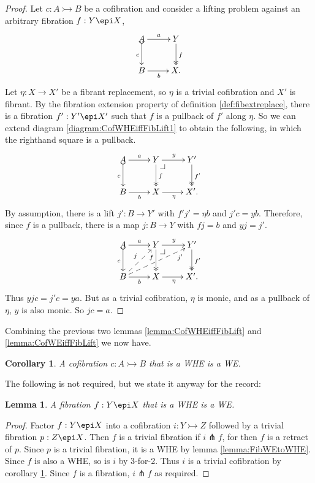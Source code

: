 \documentclass[11pt]{article}
\makeatletter
\newcommand{\pbcorner}[1][dr]{\save*!/#1-1.2pc/#1:(-1,1)@^{|-}\restore}
\newcommand{\mono}{\ensuremath{\rightarrowtail}}
\newcommand{\ra}{\ensuremath{\rightarrow}}
\newtheorem{lemma}[theorem]{Lemma}
\newtheorem{corollary}[theorem]{Corollary}
\theoremstyle{remark}
\theoremstyle{definition}
\makeatother
\begin{document}
\begin{proof}
Let $c : A\mono B$ be a cofibration and consider a lifting problem against an arbitrary fibration $f: Y\epi X$,
\begin{equation}\label{diagram:CofWHEiffFibLift1}
\xymatrix{
A \ar@{>->}[d]_{c} \ar[r]^-{a}  & Y \ar@{>>}[d]^{f} \\
B \ar[r]_{b} &  X.
}
\end{equation}
Let $\eta: X\ra X'$ be a fibrant replacement, so $\eta$ is a trivial cofibration and $X'$ is fibrant. 
By the fibration extension property of definition \ref{def:fibextreplace}, there is a fibration $f' : Y' \epi X'$ such that $f$ is a pullback of $f'$ along $\eta$. So we can extend diagram \eqref{diagram:CofWHEiffFibLift1} to obtain the following, in which the righthand square is a pullback.
\begin{equation}\label{diagram:CofWHEiffFibLift2}
\xymatrix{
A \ar@{>->}[d]_{c} \ar[r]^-{a}  & Y \ar@{>>}[d]^{f} {\pbcorner} \ar[r]^{y} & Y' \ar@{>>}[d]^{f'} \\
B \ar[r]_{b} &  X  \ar[r]_\eta &  X'.
}
\end{equation}
By assumption, there is a lift $j' : B\ra Y'$ with $f' j' = \eta b$ and $j'c = yb$.  Therefore, since $f$ is a pullback, there is a map $j : B\ra Y$ with $fj = b$ and $y j = j'$.  
\begin{equation}\label{diagram:CofWHEiffFibLift2}
\xymatrix{
A \ar@{>->}[d]_{c} \ar[r]^-{a}  & Y \ar@{>>}[d]_<<<<{f} {\pbcorner} \ar[r]^{y} & Y' \ar@{>>}[d]^{f'} \\
B \ar[r]_{b} \ar@{-->}[ru]^{j} \ar@{-->}[rru]_>>>>{j'} &  X  \ar[r]_\eta &  X'.
}
\end{equation}
Thus $yjc = j'c = ya$.  But as a trivial cofibration, $\eta$ is monic, and as a pullback of $\eta$, $y$ is also monic. So $jc=a$.
\end{proof}

Combining the previous two lemmas \ref{lemma:CofWHEiffFibLift} and \ref{lemma:CofWEiffFibLift} we now have.

\begin{corollary}\label{cor:CofWHEtoWE}
A cofibration $ c : A \mono B$ that is a WHE is a WE.
\end{corollary}

The following is not required, but we state it anyway for the record:

\begin{lemma}\label{lemma:FibWHEtoWE}
A fibration $ f : Y \epi X$ that is a WHE is a WE.
\end{lemma}
\begin{proof}
Factor $ f : Y \epi X$ into a cofibration $i : Y\mono Z$ followed by a trivial fibration $p: Z\epi X$.  Then $f$ is a trivial fibration if $i\pitchfork f$, for then $f$ is a retract of $p$.  Since $p$ is a trivial fibration, it is a WHE by lemma \ref{lemma:FibWEtoWHE}.  Since $f$ is also a WHE, so is $i$ by 3-for-2.  Thus $i$ is a trivial cofibration by corollary \ref{cor:CofWHEtoWE}. Since $f$ is a fibration, $i\pitchfork f$ as required.
\end{proof}
\end{document}
